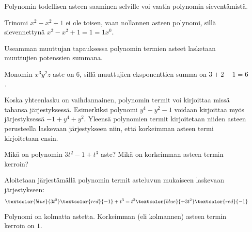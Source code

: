 Polynomin todellisen asteen saaminen selville voi vaatia polynomin sieventämistä.

\begin{esimerkki}
Trinomi $x^2-x^2+1$ ei ole toisen, vaan nollannen asteen polynomi, sillä sievennettynä $x^2-x^2+1=1=1x^0$.
\end{esimerkki}

Useamman muuttujan tapauksessa polynomin termien asteet lasketaan muuttujien potenssien summana.

\begin{esimerkki}
    Monomin $x^3y^2z$ aste on $6$, sillä muuttujien eksponenttien summa on $3+2+1=6$.
\end{esimerkki}

Koska yhteenlasku on vaihdannainen, polynomin termit voi kirjoittaa missä tahansa järjestyksessä. Esimerkiksi polynomi $y^4+y^2-1$ voidaan kirjoittaa myös järjestyksessä $-1+y^4+y^2$. Yleensä polynomien termit kirjoitetaan niiden asteen perusteella laskevaan järjestykseen niin, että korkeimman asteen termi kirjoitetaan ensin.


\begin{esimerkki}
	Mikä on polynomin $3t^2-1+t^3$ aste? Mikä on korkeimman asteen termin kerroin?
\begin{esimratk}
	
Aloitetaan järjestämällä polynomin termit asteluvun mukaiseen laskevaan järjestykseen: \\
	  \[\textcolor{blue}{3t^2}\textcolor{red}{-1}+t^3= t^3\textcolor{blue}{+3t^2}\textcolor{red}{-1}\]
\end{esimratk}

\begin{esimvast}
Polynomi on kolmatta astetta. Korkeimman (eli kolmannen) asteen termin kerroin on $1$.
\end{esimvast}

\end{esimerkki}

